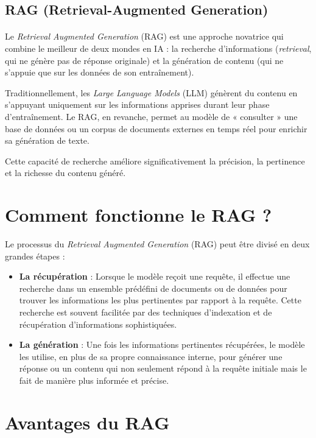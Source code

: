 \subsection{RAG (Retrieval-Augmented Generation)}
\paragraph{}
Le \textit{Retrieval Augmented Generation} (RAG) est une approche novatrice qui combine
le meilleur de deux mondes en IA : la recherche d’informations (\textit{retrieval},
qui ne génère pas de réponse originale) et la génération de contenu (qui ne
s’appuie que sur les données de son entraînement).

Traditionnellement, les \textit{Large Language Models} (LLM) génèrent du contenu
en s’appuyant uniquement sur les informations apprises durant leur phase d’entraînement.
Le RAG, en revanche, permet au modèle de « consulter » une base de données ou un
corpus de documents externes en temps réel pour enrichir sa génération de texte.

Cette capacité de recherche améliore significativement la précision, la pertinence
et la richesse du contenu généré.

\section*{Comment fonctionne le RAG ?}

Le processus du \textit{Retrieval Augmented Generation} (RAG) peut être divisé en
deux grandes étapes :

\begin{itemize}
	\item \textbf{La récupération} : Lorsque le modèle reçoit une requête, il effectue
		une recherche dans un ensemble prédéfini de documents ou de données pour trouver
		les informations les plus pertinentes par rapport à la requête. Cette
		recherche est souvent facilitée par des techniques d’indexation et de
		récupération d’informations sophistiquées.

	\item \textbf{La génération} : Une fois les informations pertinentes
		récupérées, le modèle les utilise, en plus de sa propre connaissance interne,
		pour générer une réponse ou un contenu qui non seulement répond à la requête
		initiale mais le fait de manière plus informée et précise.
\end{itemize}
\section*{Avantages du RAG}

